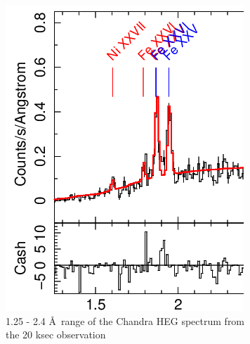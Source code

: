 \begin{figure}[h!]
    \centering
    \begin{subfigure}[t]{.3\textwidth}
        \centering
        \includegraphics[width=\linewidth]{Chapters/Figures/short_pheno_part.png}
        \caption{1.25 - 2.4 \AA\ range of the Chandra HEG spectrum from the 20 ksec observation }
        \label{shortportion}
    \end{subfigure}%
    \hspace*{4em}
    \begin{subfigure}[t]{.3\textwidth}
        \centering

\end{subfigure}
\end{figure}
